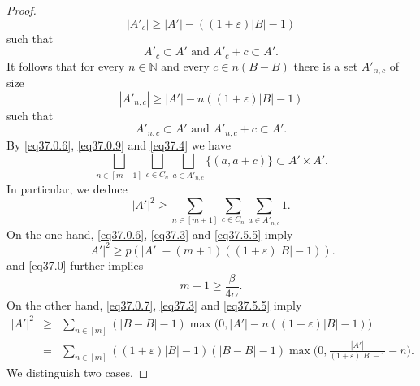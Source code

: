\documentclass[12pt,reqno]{amsart}
\theoremstyle{definition}
\renewcommand\geq{\geqslant}
\begin{document}
\begin{proof}
\begin{equation*}
    |A'_c| \geq |A'|-((1+\varepsilon) |B|-1)
\end{equation*}
such that
\begin{equation*}\label{eq37.2}
    A'_c \subset A' \text{ and } A'_c+c\subset A'.
\end{equation*}
It follows that for every $n \in \mathbb{N}$ and every $c \in n (B-B)$ there is a set
$A'_{n,c} $ of size
\begin{equation}\label{eq37.3}
    |A'_{n,c}| \geq |A'|-n((1+\varepsilon) |B|-1)
\end{equation}
such that
\begin{equation}\label{eq37.4}
     A'_{n,c} \subset A' \text{ and } A'_{n,c}+c\subset A'.
\end{equation}
By \eqref{eq37.0.6}, \eqref{eq37.0.9} and \eqref{eq37.4} we have
\begin{equation*}\label{eq37.5}
     \bigsqcup_{n \in [m+1]} \bigsqcup_{c \in C_n} \bigsqcup_{a \in A'_{n,c}}\{(a,a+c)\} \subset A'\times A'.
\end{equation*}
In particular, we deduce
\begin{equation}\label{eq37.5.5}
     |A'|^2 \geq \sum_{n \in [m+1]}\sum_{c \in C_n} \sum_{a \in A'_{n,c}}1.
\end{equation}
On the one hand,  \eqref{eq37.0.6}, \eqref{eq37.3} and \eqref{eq37.5.5} imply
\begin{equation*}\label{eq37.5.7}
     |A'|^2 \geq p(|A'|-(m+1)((1+\varepsilon)|B|-1)).
\end{equation*}
and \eqref{eq37.0} further implies
\begin{equation}\label{eq37.5.8}
     m+1 \geq \frac{\beta}{4\alpha} .
\end{equation}
On the other hand, \eqref{eq37.0.7}, \eqref{eq37.3} and \eqref{eq37.5.5}  imply
\begin{eqnarray}\label{eq37.6}
         |A'|^2
         &\geq& \sum_{n \in [m]} (|B-B|-1)\max\bigg(0,|A'|-n((1+\varepsilon)|B|-1)\bigg)\\
         &=& \sum_{n \in [m]} ((1+\varepsilon)|B|-1)(|B-B|-1)\max\bigg(0,\frac{|A'|}{(1+\varepsilon)|B|-1}-n\bigg).
\end{eqnarray}
We distinguish two cases.


\end{proof}
\end{document}

